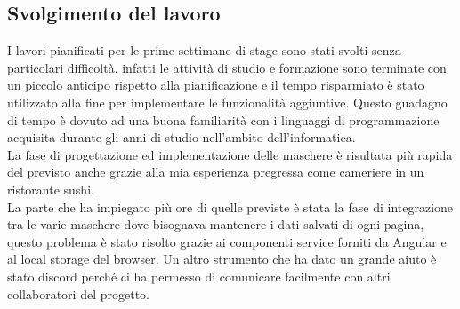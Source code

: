\subsection{Svolgimento del lavoro}
I lavori pianificati per le prime settimane di stage sono stati svolti senza particolari difficoltà, infatti le attività di studio e formazione sono terminate con un piccolo anticipo rispetto alla pianificazione e il tempo risparmiato è stato utilizzato alla fine per implementare le funzionalità aggiuntive. Questo guadagno di tempo è dovuto ad una buona familiarità con i linguaggi di programmazione acquisita durante gli anni di studio nell'ambito dell'informatica.\\
La fase di progettazione ed implementazione delle maschere è risultata più rapida del previsto anche grazie alla mia esperienza pregressa come cameriere in un ristorante sushi.\\
La parte che ha impiegato più ore di quelle previste è stata la fase di integrazione tra le varie maschere dove bisognava mantenere i dati salvati di ogni pagina, questo problema è stato risolto grazie ai componenti service forniti da Angular e al local storage del browser. Un altro strumento che ha dato un grande aiuto è stato discord perché ci ha permesso di comunicare facilmente con altri collaboratori del progetto.\\
